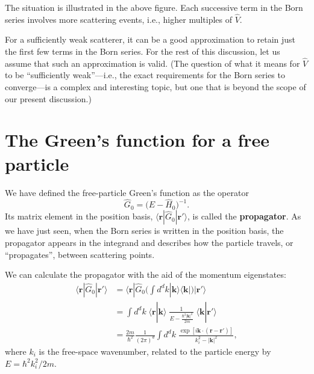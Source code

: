 \documentclass[pra,12pt]{revtex4}
\begin{document}
The situation is illustrated in the above figure.  Each successive
term in the Born series involves more scattering events, i.e., higher
multiples of $\hat{V}$.

For a sufficiently weak scatterer, it can be a good approximation to
retain just the first few terms in the Born series.  For the rest of
this discussion, let us assume that such an approximation is valid.
(The question of what it means for $\hat{V}$ to be ``sufficiently
weak''---i.e., the exact requirements for the Born series to
converge---is a complex and interesting topic, but one that is beyond
the scope of our present discussion.)

\section{The Green's function for a free particle}
\label{sec:freegreen}

We have defined the free-particle Green's function as the operator
$$\hat{G}_0=\big(E-\hat{H}_0\big)^{-1}.$$
Its matrix element in the position basis,
$\langle\mathbf{r}|\hat{G}_0|\mathbf{r}'\rangle$, is called the
\textbf{propagator}.  As we have just seen, when the Born series is
written in the position basis, the propagator appears in the integrand
and describes how the particle travels, or ``propagates'', between
scattering points.

We can calculate the propagator with the aid of the momentum
eigenstates:
$$\begin{aligned}\langle\mathbf{r}|\hat{G}_0|\mathbf{r}'\rangle &=
  \langle\mathbf{r}|\hat{G}_0 \Big(\int d^dk |\mathbf{k}\rangle\langle\mathbf{k}| \Big) |\mathbf{r}'\rangle \\ &= \int d^dk \; \langle\mathbf{r}|\mathbf{k}\rangle \; \frac{1}{E-\frac{\hbar^2|\mathbf{k}|^2}{2m}} \; \langle\mathbf{k}|\mathbf{r}'\rangle \\ &= \frac{2m}{\hbar^2} \frac{1}{(2\pi)^d} \int d^dk \; \frac{\exp\left[i\mathbf{k}\cdot (\mathbf{r}-\mathbf{r}')\right]}{k_i^2-|\mathbf{k}|^2},\end{aligned}$$
where $k_i$ is the free-space wavenumber, related to the
particle energy by $E = \hbar^2 k_i^2/2m$.
\end{document}
